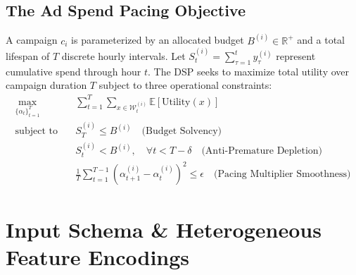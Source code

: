 \documentclass[11pt,a4paper]{article}
\begin{document}
\subsection{The Ad Spend Pacing Objective}
A campaign $c_i$ is parameterized by an allocated budget $B^{(i)} \in \mathbb{R}^+$ and a total lifespan of $T$ discrete hourly intervals. Let $S_t^{(i)} = \sum_{\tau=1}^t y_\tau^{(i)}$ represent cumulative spend through hour $t$. The DSP seeks to maximize total utility over campaign duration $T$ subject to three operational constraints:
\begin{align}
    \max_{\{\alpha_t\}_{t=1}^T} \quad & \sum_{t=1}^T \sum_{x \in \mathcal{W}_t^{(i)}} \mathbb{E}[\text{Utility}(x)] \\
    \text{subject to} \quad & S_T^{(i)} \le B^{(i)} \quad \text{(Budget Solvency)} \label{eq:solvency} \\
    & S_t^{(i)} < B^{(i)}, \quad \forall t < T - \delta \quad \text{(Anti-Premature Depletion)} \label{eq:anti_depletion} \\
    & \frac{1}{T}\sum_{t=1}^{T-1} (\alpha_{t+1}^{(i)} - \alpha_t^{(i)})^2 \le \epsilon \quad \text{(Pacing Multiplier Smoothness)} \label{eq:smoothness}
\end{align}

\section{Input Schema \& Heterogeneous Feature Encodings}
\end{document}

